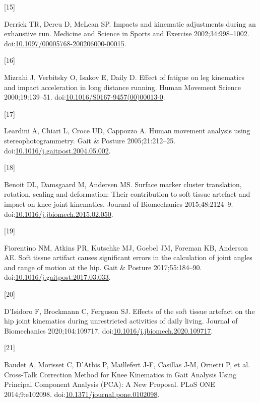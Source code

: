 \documentclass[]{elsarticle} %
\newlength{\cslhangindent}
\newlength{\csllabelwidth}
\newlength{\cslentryspacingunit} %
\newenvironment{CSLReferences}[2] %
 {%
  \setlength{\parindent}{0pt}
  \ifodd #1
  \let\oldpar\par
  \def\par{\hangindent=\cslhangindent\oldpar}
  \fi
  \setlength{\parskip}{#2\cslentryspacingunit}
 }%
 {}
\newcommand{\CSLLeftMargin}[1]{\parbox[t]{\csllabelwidth}{#1}}
\newcommand{\CSLRightInline}[1]{\parbox[t]{\linewidth - \csllabelwidth}{#1}\break}
\begin{document}
\begin{CSLReferences}{0}{0}
\leavevmode{}%
\CSLLeftMargin{{[}15{]} }
\CSLRightInline{Derrick TR, Dereu D, McLean SP. {Impacts and kinematic
adjustments during an exhaustive run.} Medicine and Science in Sports
and Exercise 2002;34:998--1002.
doi:\href{https://doi.org/10.1097/00005768-200206000-00015}{10.1097/00005768-200206000-00015}.}

\leavevmode{}%
\CSLLeftMargin{{[}16{]} }
\CSLRightInline{Mizrahi J, Verbitsky O, Isakov E, Daily D. {Effect of
fatigue on leg kinematics and impact acceleration in long distance
running}. Human Movement Science 2000;19:139--51.
doi:\href{https://doi.org/10.1016/S0167-9457(00)00013-0}{10.1016/S0167-9457(00)00013-0}.}

\leavevmode{}%
\CSLLeftMargin{{[}17{]} }
\CSLRightInline{Leardini A, Chiari L, Croce UD, Cappozzo A. {Human
movement analysis using stereophotogrammetry}. Gait \& Posture
2005;21:212--25.
doi:\href{https://doi.org/10.1016/j.gaitpost.2004.05.002}{10.1016/j.gaitpost.2004.05.002}.}

\leavevmode{}%
\CSLLeftMargin{{[}18{]} }
\CSLRightInline{Benoit DL, Damsgaard M, Andersen MS. {Surface marker
cluster translation, rotation, scaling and deformation: Their
contribution to soft tissue artefact and impact on knee joint
kinematics}. Journal of Biomechanics 2015;48:2124--9.
doi:\href{https://doi.org/10.1016/j.jbiomech.2015.02.050}{10.1016/j.jbiomech.2015.02.050}.}

\leavevmode{}%
\CSLLeftMargin{{[}19{]} }
\CSLRightInline{Fiorentino NM, Atkins PR, Kutschke MJ, Goebel JM,
Foreman KB, Anderson AE. {Soft tissue artifact causes significant errors
in the calculation of joint angles and range of motion at the hip}. Gait
\& Posture 2017;55:184--90.
doi:\href{https://doi.org/10.1016/j.gaitpost.2017.03.033}{10.1016/j.gaitpost.2017.03.033}.}

\leavevmode{}%
\CSLLeftMargin{{[}20{]} }
\CSLRightInline{D'Isidoro F, Brockmann C, Ferguson SJ. {Effects of the
soft tissue artefact on the hip joint kinematics during unrestricted
activities of daily living}. Journal of Biomechanics 2020;104:109717.
doi:\href{https://doi.org/10.1016/j.jbiomech.2020.109717}{10.1016/j.jbiomech.2020.109717}.}

\leavevmode{}%
\CSLLeftMargin{{[}21{]} }
\CSLRightInline{Baudet A, Morisset C, D'Athis P, Maillefert J-F,
Casillas J-M, Ornetti P, et al. {Cross-Talk Correction Method for Knee
Kinematics in Gait Analysis Using Principal Component Analysis (PCA): A
New Proposal}. PLoS ONE 2014;9:e102098.
doi:\href{https://doi.org/10.1371/journal.pone.0102098}{10.1371/journal.pone.0102098}.}


\end{CSLReferences}
\end{document}
